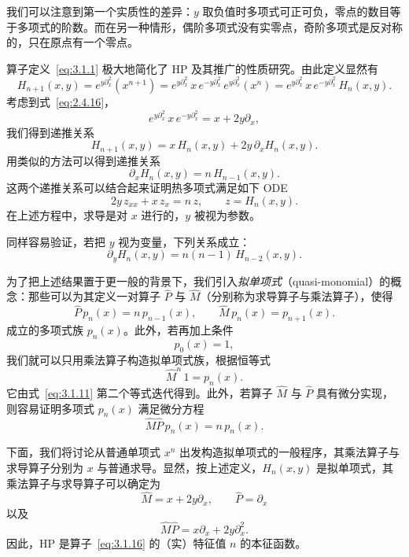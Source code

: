 我们可以注意到第一个实质性的差异：$y$ 取负值时多项式可正可负，零点的数目等于多项式的阶数。而在另一种情形，偶阶多项式没有实零点，奇阶多项式是反对称的，只在原点有一个零点。

\medskip
算子定义~\eqref{eq:3.1.1} 极大地简化了 HP 及其推广的性质研究。由此定义显然有
\[
H_{n+1}(x,y)=e^{y\partial_x^2}(x^{n+1})
=e^{y\partial_x^2}\,x\,e^{-y\partial_x^2}\,e^{y\partial_x^2}(x^n)
=e^{y\partial_x^2}\,x\,e^{-y\partial_x^2}\,H_n(x,y).
\]
考虑到式~\eqref{eq:2.4.16}，
\[
e^{y\partial_x^2}\,x\,e^{-y\partial_x^2}=x+2y\partial_x,
\]
我们得到递推关系
\begin{equation}
H_{n+1}(x,y)=x\,H_n(x,y)+2y\,\partial_x H_n(x,y).
\label{eq:3.1.7}
\end{equation}
用类似的方法可以得到递推关系
\begin{equation}
\partial_x H_n(x,y)=n\,H_{n-1}(x,y).
\label{eq:3.1.8}
\end{equation}
这两个递推关系可以结合起来证明热多项式满足如下 ODE
\begin{equation}
2y\,z_{xx}+x\,z_x=n\,z,\qquad z=H_n(x,y).
\label{eq:3.1.9}
\end{equation}
在上述方程中，求导是对 $x$ 进行的，$y$ 被视为参数。

同样容易验证，若把 $y$ 视为变量，下列关系成立：
\begin{equation}
\partial_y H_n(x,y)=n(n-1)\,H_{n-2}(x,y).
\label{eq:3.1.10}
\end{equation}

为了把上述结果置于更一般的背景下，我们引入\emph{拟单项式}（quasi-monomial）的概念：那些可以为其定义一对算子 $\hat P$ 与 $\hat M$（分别称为求导算子与乘法算子），使得
\begin{equation}
\hat P\,p_n(x)=n\,p_{n-1}(x),\qquad
\hat M\,p_n(x)=p_{n+1}(x).
\label{eq:3.1.11}
\end{equation}
成立的多项式族 $p_n(x)$。此外，若再加上条件
\begin{equation}
p_0(x)=1,
\label{eq:3.1.12}
\end{equation}
我们就可以只用乘法算子构造拟单项式族，根据恒等式
\begin{equation}
\hat M^n\,1=p_n(x).
\label{eq:3.1.13}
\end{equation}
它由式~\eqref{eq:3.1.11} 第二个等式迭代得到。此外，若算子 $\hat M$ 与 $\hat P$ 具有微分实现，则容易证明多项式 $p_n(x)$ 满足微分方程
\begin{equation}
\hat M\hat P\,p_n(x)=n\,p_n(x).
\label{eq:3.1.14}
\end{equation}

下面，我们将讨论从普通单项式 $x^n$ 出发构造拟单项式的一般程序，其乘法算子与求导算子分别为 $x$ 与普通求导。显然，按上述定义，$H_n(x,y)$ 是拟单项式，其乘法算子与求导算子可以确定为
\begin{equation}
\hat M=x+2y\partial_x,\qquad \hat P=\partial_x
\label{eq:3.1.15}
\end{equation}
以及
\begin{equation}
\hat M\hat P=x\partial_x+2y\partial_x^2.
\label{eq:3.1.16}
\end{equation}
因此，HP 是算子~\eqref{eq:3.1.16} 的（实）特征值 $n$ 的本征函数。

